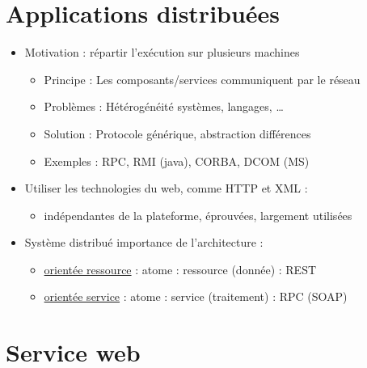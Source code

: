 \hypertarget{applications-distribuuxe9es}{%
\section{Applications distribuées}\label{applications-distribuuxe9es}}

\begin{itemize}
\tightlist
\item
  Motivation : répartir l'exécution sur plusieurs machines

  \begin{itemize}
  \tightlist
  \item
    Principe : Les composants/services communiquent par le réseau
  \item
    Problèmes : Hétérogénéité systèmes, langages, \ldots{}
  \item
    Solution : Protocole générique, abstraction différences
  \item
    Exemples : RPC, RMI (java), CORBA, DCOM (MS)
  \end{itemize}
\item
  Utiliser les technologies du web, comme HTTP et XML :

  \begin{itemize}
  \tightlist
  \item
    indépendantes de la plateforme, éprouvées, largement utilisées
  \end{itemize}
\item
  Système distribué importance de l'architecture :

  \begin{itemize}
  \tightlist
  \item
    \href{https://en.wikipedia.org/wiki/Resource-oriented_architecture}{orientée
    ressource} : atome : ressource (donnée) : REST
  \item
    \href{https://fr.wikipedia.org/wiki/Architecture_orient\%C3\%A9e_services}{orientée
    service} : atome : service (traitement) : RPC (SOAP)
  \end{itemize}
\end{itemize}

\hypertarget{service-web}{%
\section{Service web}\label{service-web}}

